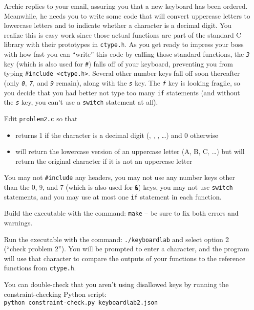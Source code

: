 Archie replies to your email, assuring you that a new keyboard has been ordered.
Meanwhile, he needs you to write some code that will convert uppercase letters to lowercase letters and to indicate whether a character is a decimal digit.
You realize this is easy work since those actual functions are part of the standard C library with their prototypes in \texttt{ctype.h}.
As you get ready to impress your boss with how fast you can ``write'' this code by calling those standard functions, the \textit{\texttt{3}} key (which is also used for \textit{\texttt{\#}}) falls off of your keyboard, preventing you from typing \lstinline{#include <ctype.h>}.
Several other number keys fall off soon thereafter (only \textit{\texttt{0}}, \textit{\texttt{7}}, and \textit{\texttt{9}} remain), along with the \textit{\texttt{s}} key.
The \textit{\texttt{f}} key is looking fragile, so you decide that you had better not type too many \lstinline{if} statements (and without the \textit{\texttt{s}} key, you can't use a \lstinline{switch} statement at all).

Edit \texttt{problem2.c} so that
\begin{itemize}
    \item {} returns 1 if the character is a decimal digit (\textquotesingle, \textquotesingle, \textquotesingle, \dots) and 0 otherwise
    \item {} will return the lowercase version of an uppercase letter (\textquotesingle A\textquotesingle, \textquotesingle B\textquotesingle, \textquotesingle C\textquotesingle, \dots) but will return the original character if it is not an uppercase letter
\end{itemize}
You may not \lstinline{#include} any headers, you may not use any number keys other than the 0, 9, and 7 (which is also used for \textbf{\texttt{\&}}) keys, you may not use \lstinline{switch} statements, and you may use at most one \lstinline{if} statement in each function.

Build the executable with the command: \texttt{make} -- be sure to fix both errors and warnings.

Run the executable with the command: \texttt{./keyboardlab} and select option 2 (``check problem 2'').
You will be prompted to enter a character, and the program will use that character to compare the outputs of your functions to the reference functions from \texttt{ctype.h}.

You can double-check that you aren't using disallowed keys by running the constraint-checking Python script: \\
\texttt{python constraint-check.py keyboardlab2.json}

